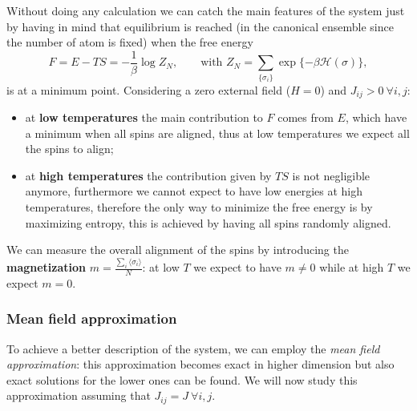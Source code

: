Without doing any calculation we can catch the main features of the system just by having in mind that equilibrium is reached (in the canonical ensemble since the number of atom is fixed) when the free energy 
\begin{equation*}
    F=E-TS=-\frac{1}{\beta}\log Z_{N},\qquad \text{with }Z_{N}=\sum_{\{\sigma_i\}}\exp\{-\beta\mathcal{H} (\sigma)\},
\end{equation*}
is at a minimum point. Considering a zero external field ($H=0$) and $J_{ij}>0\ \forall i,j$:
\begin{itemize}
    \item at \textbf{low temperatures} the main contribution to $F$ comes from $E$, which have a minimum when all spins are aligned, thus at low temperatures we expect all the spins to align;
    \item at \textbf{high temperatures} the contribution given by $TS$ is not negligible anymore, furthermore we cannot expect to have low energies at high temperatures, therefore the only way to minimize the free energy is by maximizing entropy, this is achieved by having all spins randomly aligned.
\end{itemize}
We can measure the overall alignment of the spins by introducing the \textbf{magnetization} $m=\frac{\sum_i\langle \sigma_i\rangle}{N} $: at low $T$ we expect to have $m\neq 0$ while at high $T$ we expect $m=0$.
\subsubsection{Mean field approximation}
To achieve a better description of the system, we can employ the \emph{mean field approximation}: this approximation becomes exact in higher dimension but also exact solutions for the lower ones can be found. We will now study this approximation assuming that $J_{ij}=J\ \forall i,j$.

